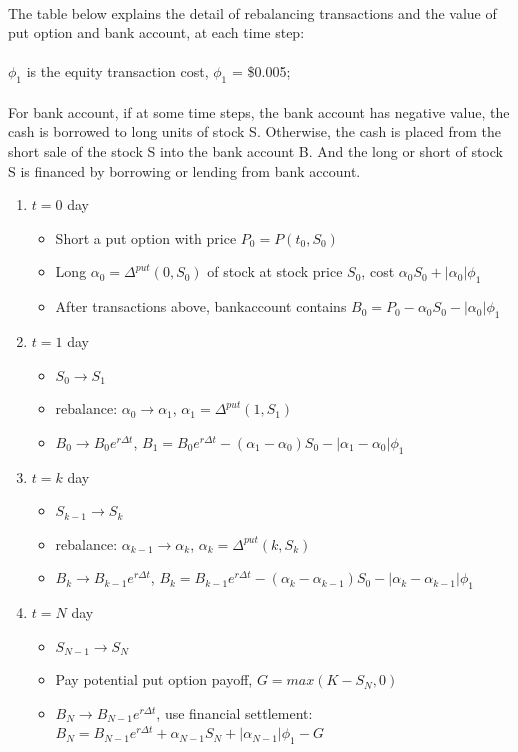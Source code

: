 \documentclass[12pt]{article}
\begin{document}
\\The table below explains the detail of rebalancing transactions and the value of put option and bank account, at each time step:\\
\\ $\phi_1$ is the equity transaction cost, $\phi_1$ = \$0.005;\\
\\For bank account, if at some time steps, the bank account has negative value, the cash is borrowed to long units of stock S. Otherwise, the cash is placed from the short sale of the stock S into the bank account B. And the long or short of stock S is financed by borrowing or lending from bank account.

\begin{enumerate}
  \item $t=0$ day
  \begin{itemize}
    \item Short a put option with price $P_0=P(t_0, S_0)$
    \item Long $\alpha_0=\Delta^{put}(0, S_0)$ of stock at stock price $S_0$, cost $\alpha_0S_0 + |\alpha_0|\phi_1$
    \item After transactions above, bankaccount contains $B_0=P_0-\alpha_0S_0 - |\alpha_0|\phi_1$
  \end{itemize}

  \item $t=1$ day
  \begin{itemize}
    \item $S_0 \rightarrow S_1$
    \item rebalance: $\alpha_0 \rightarrow \alpha_1$, $\alpha_1 = \Delta^{put}(1, S_1)$
    \item $B_0 \rightarrow B_0e^{r\Delta t}$, $B_1 = B_0e^{r\Delta t} - (\alpha_1-\alpha_0)S_0 - |\alpha_1-\alpha_0|\phi_1$
  \end{itemize}
  
  \item $t=k$ day
  \begin{itemize}
    \item $S_{k-1} \rightarrow S_k$
    \item rebalance: $\alpha_{k-1} \rightarrow \alpha_k$, $\alpha_k = \Delta^{put}(k, S_k)$
    \item $B_k \rightarrow B_{k-1}e^{r\Delta t}$, $B_k = B_{k-1}e^{r\Delta t} - (\alpha_k-\alpha_{k-1})S_0 - |\alpha_k-\alpha_{k-1}|\phi_1$
  \end{itemize}

  \item $t=N$ day
  \begin{itemize}
    \item $S_{N-1} \rightarrow S_N$
    \item Pay potential put option payoff, $G = max(K-S_N,0)$
    \item $B_N \rightarrow B_{N-1}e^{r\Delta t}$, use financial settlement:\\
      $B_N = B_{N-1}e^{r\Delta t} + \alpha_{N-1}S_N + |\alpha_{N-1}|\phi_1 -G$
  \end{itemize}
\end{enumerate}
\end{document}
